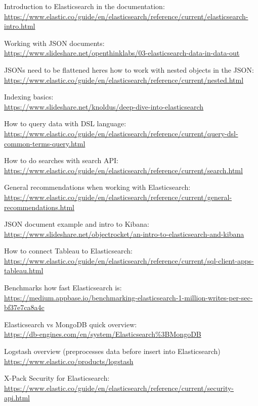 \documentclass[12pt, numbers=noenddot]{scrreprt} %
\begin{document}
Introduction to Elasticsearch in the documentation: \\
\url{https://www.elastic.co/guide/en/elasticsearch/reference/current/elasticsearch-intro.html}

Working with JSON documents: \\
\url{https://www.slideshare.net/openthinklabs/03-elasticsearch-data-in-data-out}

JSONs need to be flattened heres how to work with nested objects in the JSON: \\
\url{https://www.elastic.co/guide/en/elasticsearch/reference/current/nested.html}

Indexing basics: \\
\url{https://www.slideshare.net/knoldus/deep-dive-into-elasticsearch}

How to query data with DSL language: \\
\url{https://www.elastic.co/guide/en/elasticsearch/reference/current/query-dsl-common-terms-query.html}

How to do searches with search API: \\
\url{https://www.elastic.co/guide/en/elasticsearch/reference/current/search.html}

General recommendations when working with Elasticsearch: \\
\url{https://www.elastic.co/guide/en/elasticsearch/reference/current/general-recommendations.html}

JSON document example and intro to Kibana: \\
\url{https://www.slideshare.net/objectrocket/an-intro-to-elasticsearch-and-kibana}

How to connect Tableau to Elasticsearch: \\
\url{https://www.elastic.co/guide/en/elasticsearch/reference/current/sql-client-apps-tableau.html}

Benchmarks how fast Elasticsearch is: \\
\url{https://medium.appbase.io/benchmarking-elasticsearch-1-million-writes-per-sec-bf37e7ca8a4c}

Elasticsearch vs MongoDB quick overview: \\
\url{https://db-engines.com/en/system/Elasticsearch%3BMongoDB}

Logstash overview (preprocesses data before insert into Elasticsearch)
\url{https://www.elastic.co/products/logstash}

X-Pack Security for Elasticsearch: \\
\url{https://www.elastic.co/guide/en/elasticsearch/reference/current/security-api.html}
\end{document}
